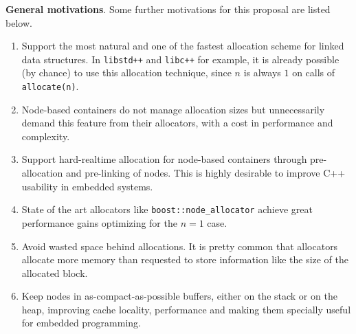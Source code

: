 \documentclass[11pt]{article}
\begin{document}
\medskip
\noindent
{\bf General motivations}. Some further motivations for this proposal are listed
below.
\begin{enumerate}

\item Support the most natural and one of the fastest allocation
scheme for linked data structures. In \texttt{libstd++} and
\texttt{libc++} for example, it is already possible (by chance) to use
this allocation technique, since $n$ is always $1$ on calls of
\texttt{allocate(n)}.

\item Node-based containers do not manage allocation sizes but
unnecessarily demand this feature from their allocators, with a cost
in performance and complexity.


\item Support hard-realtime allocation for node-based containers
through pre-allocation and pre-linking of nodes. This is highly
desirable to improve C++ usability in embedded systems.

\item State of the art allocators like \texttt{boost::node\_allocator}
\cite{boost} achieve great performance gains optimizing for the $n = 1$ case. 

\item Avoid wasted space behind allocations. It is pretty common that
allocators allocate more memory than requested to store information
like the size of the allocated block.

\item Keep nodes in as-compact-as-possible buffers, either on the
stack or on the heap, improving cache locality, performance and making
them specially useful for embedded programming.

\end{enumerate}

%
%
\end{document}

